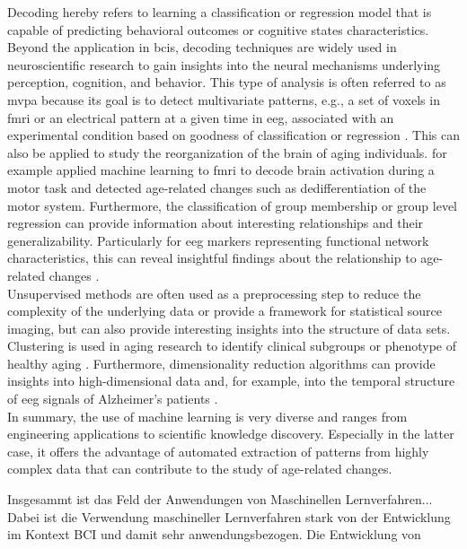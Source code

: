 Decoding hereby refers to learning a classification or regression model that is capable of predicting behavioral outcomes or cognitive states characteristics. Beyond the application in \glspl{bci}, decoding techniques are widely used in neuroscientific research to gain insights into the neural mechanisms underlying perception, cognition, and behavior. This type of analysis is often referred to as \gls{mvpa} because its goal is to detect multivariate patterns, e.g., a set of voxels in \gls{fmri} or an electrical pattern at a given time in \gls{eeg}, associated with an experimental condition based on goodness of classification or regression \cite{Holdgraf2017}. This can also be applied to study the reorganization of the brain of aging individuals. \cite{Carb2011} for example applied machine learning to \gls{fmri} to decode brain activation during a motor task and detected age-related changes such as dedifferentiation of the motor system. Furthermore, the classification of group membership or group level regression can provide information about interesting relationships and their generalizability. Particularly for \gls{eeg} markers representing functional network characteristics, this can reveal insightful findings about the relationship to age-related changes \cite{Petti2016}.\\
Unsupervised methods are often used as a preprocessing step to reduce the complexity of the underlying data or provide a framework for statistical source imaging, but can also provide interesting insights into the structure of data sets. Clustering is used in aging research to identify clinical subgroups or phenotype of healthy aging \cite{Marron2019}. Furthermore, dimensionality reduction algorithms can provide insights into high-dimensional data and, for example, into the temporal structure of \gls{eeg} signals of Alzheimer's patients \cite{Smailovic2019}.\\
In summary, the use of machine learning is very diverse and ranges from engineering applications to scientific knowledge discovery. Especially in the latter case, it offers the advantage of automated extraction of patterns from highly complex data that can contribute to the study of age-related changes. 


Insgesammt ist das Feld der Anwendungen von Maschinellen Lernverfahren... Dabei ist die Verwendung maschineller Lernverfahren stark von der Entwicklung im Kontext BCI und damit sehr anwendungsbezogen. Die Entwicklung von 

